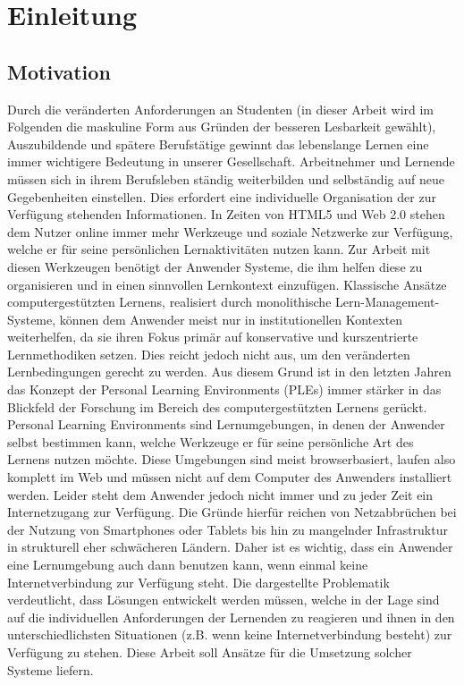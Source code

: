 \chapter{Einleitung} 
\label{chapter:Kapitel1}
\section{Motivation}
Durch die veränderten Anforderungen an Studenten (in dieser Arbeit wird im Folgenden die maskuline Form aus Gründen der besseren Lesbarkeit gewählt), Auszubildende und spätere Berufstätige gewinnt das lebenslange Lernen eine immer wichtigere Bedeutung in unserer Gesellschaft. Arbeitnehmer und Lernende müssen sich in ihrem Berufsleben ständig weiterbilden und selbständig auf neue Gegebenheiten einstellen. Dies erfordert eine individuelle Organisation der zur Verfügung stehenden Informationen. In Zeiten von HTML5 und Web 2.0 stehen dem Nutzer online immer mehr Werkzeuge und soziale Netzwerke zur Verfügung, welche er für seine persönlichen Lernaktivitäten nutzen kann. Zur Arbeit mit diesen Werkzeugen benötigt der Anwender Systeme, die ihm helfen diese zu organisieren und in einen sinnvollen Lernkontext einzufügen. Klassische Ansätze computergestützten Lernens, realisiert durch monolithische Lern-Management-Systeme, können dem Anwender meist nur in institutionellen Kontexten weiterhelfen, da sie ihren Fokus primär auf konservative und kurszentrierte Lernmethodiken setzen. Dies reicht jedoch nicht aus, um den veränderten Lernbedingungen gerecht zu werden. Aus diesem Grund ist in den letzten Jahren das Konzept der Personal Learning Environments (PLEs) immer stärker in das Blickfeld der Forschung im Bereich des computergestützten Lernens gerückt. Personal Learning Environments sind Lernumgebungen, in denen der Anwender selbst bestimmen kann, welche Werkzeuge er für seine persönliche Art des Lernens nutzen möchte. Diese Umgebungen sind meist browserbasiert, laufen also komplett im Web und müssen nicht auf dem Computer des Anwenders installiert werden. 
Leider steht dem Anwender jedoch nicht immer und zu jeder Zeit ein Internetzugang zur Verfügung. Die Gründe hierfür reichen von Netzabbrüchen bei der Nutzung von Smartphones oder Tablets bis hin zu mangelnder Infrastruktur in strukturell eher schwächeren Ländern. Daher ist es wichtig, dass ein Anwender eine Lernumgebung auch dann benutzen kann, wenn einmal keine Internetverbindung zur Verfügung steht. Die dargestellte Problematik verdeutlicht, dass Lösungen entwickelt werden müssen, welche in der Lage sind auf die individuellen Anforderungen der Lernenden zu reagieren und ihnen in den unterschiedlichsten Situationen (z.B. wenn keine Internetverbindung besteht) zur Verfügung zu stehen. Diese Arbeit soll Ansätze für die Umsetzung solcher Systeme liefern.

